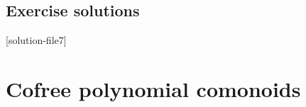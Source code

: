 \documentclass[Book-Poly]{subfiles}
\begin{document}
%
%

\section{Exercise solutions}
{\footnotesize
}

[solution-file7]

\chapter{Cofree polynomial comonoids}\label{sec.cofree}
\end{document}
